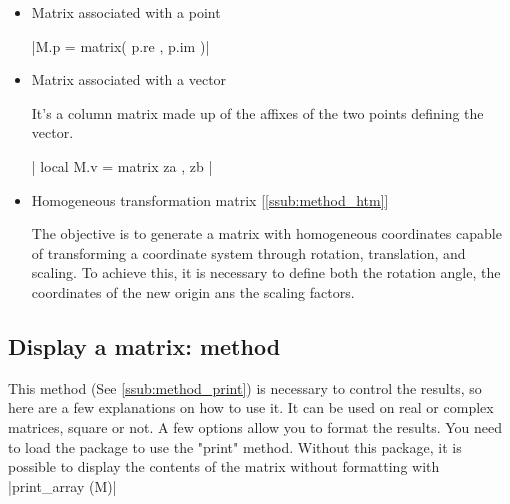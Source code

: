 \begin{itemize}
\begin{tkzexample}[latex=.5\textwidth]
\end{tkzexample}


\item Matrix associated with a point

  |M.p = matrix({ { p.re }, { p.im } })|

\item Matrix associated with a vector

It's a column matrix made up of the affixes of the two points defining the vector.

| local M.v = matrix{ { za }, { zb } }|

\begin{tkzexample}[latex=.5\textwidth]
\end{tkzexample}



\item  Homogeneous transformation matrix [\ref{ssub:method_htm}]

  The objective is to generate a matrix with homogeneous coordinates capable of transforming a coordinate system through rotation, translation, and scaling. To achieve this, it is necessary to define both the rotation angle, the coordinates of the new origin ans the scaling factors.

\begin{tkzexample}[latex=.35\textwidth]
\end{tkzexample}

\end{itemize}

\subsection{Display a matrix: method }
\label{sub:display_a_matrix_method_print}


This method (See  \ref{ssub:method_print}) is necessary to control the results, so here are a few explanations on how to use it. It can be used on real or complex matrices, square or not. A few options allow you to format the results. You need to load the  package to use the "print" method. Without this package, it is possible to display the contents of the matrix without formatting with |print_array (M)|

